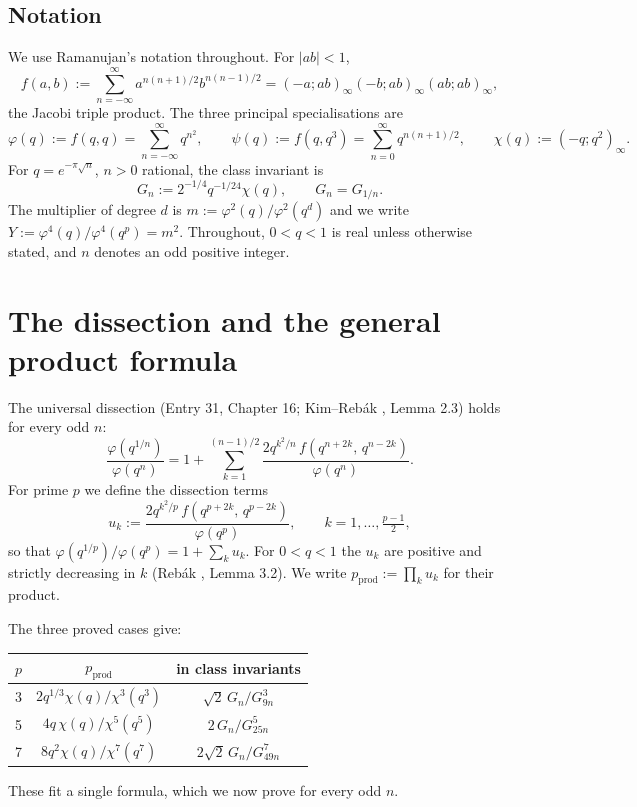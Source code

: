 \documentclass[11pt]{amsart}
\theoremstyle{plain}
\theoremstyle{definition}
\theoremstyle{remark}
\newcommand{\pprod}{p_{\mathrm{prod}}}
\begin{document}
\subsection{Notation}
We use Ramanujan's notation throughout. For $|ab|<1$,
\begin{equation}
f(a,b) := \sum_{n=-\infty}^{\infty} a^{n(n+1)/2} b^{n(n-1)/2}
= (-a;ab)_\infty(-b;ab)_\infty(ab;ab)_\infty,
\end{equation}
the Jacobi triple product. The three principal specialisations are
\begin{equation}
\varphi(q) := f(q,q) = \sum_{n=-\infty}^{\infty} q^{n^2}, \qquad
\psi(q) := f(q,q^3) = \sum_{n=0}^{\infty} q^{n(n+1)/2}, \qquad
\chi(q) := (-q;q^2)_\infty.
\end{equation}
For $q = e^{-\pi\sqrt{n}}$, $n>0$ rational, the class invariant is
\begin{equation}
G_n := 2^{-1/4} q^{-1/24}\chi(q), \qquad G_n = G_{1/n}.
\end{equation}
The multiplier of degree $d$ is $m := \varphi^2(q)/\varphi^2(q^d)$ and we write
$Y := \varphi^4(q)/\varphi^4(q^p) = m^2$. Throughout, $0<q<1$ is real unless
otherwise stated, and $n$ denotes an odd positive integer.

\section{The dissection and the general product formula}
\label{sec:pprod}

The universal dissection (Entry 31, Chapter 16; Kim--Reb\'ak \cite{KR25}, Lemma 2.3)
holds for every odd $n$:
\begin{equation}
\frac{\varphi(q^{1/n})}{\varphi(q^n)}
= 1 + \sum_{k=1}^{(n-1)/2} \frac{2q^{k^2/n}\, f(q^{n+2k},\, q^{n-2k})}{\varphi(q^n)}.
\label{eq:dissection}
\end{equation}
For prime $p$ we define the dissection terms
\begin{equation}
u_k := \frac{2q^{k^2/p}\, f(q^{p+2k},\, q^{p-2k})}{\varphi(q^p)},
\qquad k = 1, \dots, \tfrac{p-1}{2},
\label{eq:uk}
\end{equation}
so that $\varphi(q^{1/p})/\varphi(q^p) = 1 + \sum_k u_k$. For $0<q<1$ the $u_k$
are positive and strictly decreasing in $k$ (Reb\'ak \cite{Reb23}, Lemma 3.2).
We write $\pprod := \prod_k u_k$ for their product.

The three proved cases give:
\begin{center}
\begin{tabular}{c|c|c}
$p$ & $\pprod$ & in class invariants \\ \hline
3 & $2q^{1/3}\chi(q)/\chi^3(q^3)$ & $\sqrt{2}\,G_n/G_{9n}^3$ \\
5 & $4q\,\chi(q)/\chi^5(q^5)$ & $2\,G_n/G_{25n}^5$ \\
7 & $8q^2\chi(q)/\chi^7(q^7)$ & $2\sqrt{2}\,G_n/G_{49n}^7$
\end{tabular}
\end{center}
These fit a single formula, which we now prove for every odd $n$.
\end{document}
